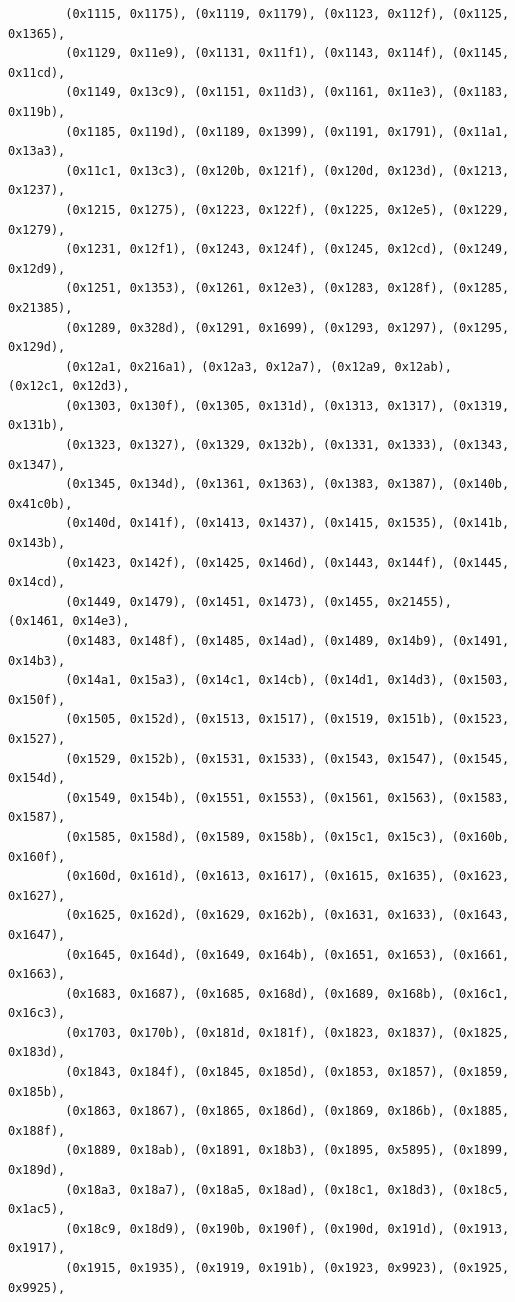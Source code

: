 \documentclass[11pt,a4paper]{article}
\begin{document}
\begin{lstlisting}
        (0x1115, 0x1175), (0x1119, 0x1179), (0x1123, 0x112f), (0x1125, 0x1365),
        (0x1129, 0x11e9), (0x1131, 0x11f1), (0x1143, 0x114f), (0x1145, 0x11cd),
        (0x1149, 0x13c9), (0x1151, 0x11d3), (0x1161, 0x11e3), (0x1183, 0x119b),
        (0x1185, 0x119d), (0x1189, 0x1399), (0x1191, 0x1791), (0x11a1, 0x13a3),
        (0x11c1, 0x13c3), (0x120b, 0x121f), (0x120d, 0x123d), (0x1213, 0x1237),
        (0x1215, 0x1275), (0x1223, 0x122f), (0x1225, 0x12e5), (0x1229, 0x1279),
        (0x1231, 0x12f1), (0x1243, 0x124f), (0x1245, 0x12cd), (0x1249, 0x12d9),
        (0x1251, 0x1353), (0x1261, 0x12e3), (0x1283, 0x128f), (0x1285, 0x21385),
        (0x1289, 0x328d), (0x1291, 0x1699), (0x1293, 0x1297), (0x1295, 0x129d),
        (0x12a1, 0x216a1), (0x12a3, 0x12a7), (0x12a9, 0x12ab), (0x12c1, 0x12d3),
        (0x1303, 0x130f), (0x1305, 0x131d), (0x1313, 0x1317), (0x1319, 0x131b),
        (0x1323, 0x1327), (0x1329, 0x132b), (0x1331, 0x1333), (0x1343, 0x1347),
        (0x1345, 0x134d), (0x1361, 0x1363), (0x1383, 0x1387), (0x140b, 0x41c0b),
        (0x140d, 0x141f), (0x1413, 0x1437), (0x1415, 0x1535), (0x141b, 0x143b),
        (0x1423, 0x142f), (0x1425, 0x146d), (0x1443, 0x144f), (0x1445, 0x14cd),
        (0x1449, 0x1479), (0x1451, 0x1473), (0x1455, 0x21455), (0x1461, 0x14e3),
        (0x1483, 0x148f), (0x1485, 0x14ad), (0x1489, 0x14b9), (0x1491, 0x14b3),
        (0x14a1, 0x15a3), (0x14c1, 0x14cb), (0x14d1, 0x14d3), (0x1503, 0x150f),
        (0x1505, 0x152d), (0x1513, 0x1517), (0x1519, 0x151b), (0x1523, 0x1527),
        (0x1529, 0x152b), (0x1531, 0x1533), (0x1543, 0x1547), (0x1545, 0x154d),
        (0x1549, 0x154b), (0x1551, 0x1553), (0x1561, 0x1563), (0x1583, 0x1587),
        (0x1585, 0x158d), (0x1589, 0x158b), (0x15c1, 0x15c3), (0x160b, 0x160f),
        (0x160d, 0x161d), (0x1613, 0x1617), (0x1615, 0x1635), (0x1623, 0x1627),
        (0x1625, 0x162d), (0x1629, 0x162b), (0x1631, 0x1633), (0x1643, 0x1647),
        (0x1645, 0x164d), (0x1649, 0x164b), (0x1651, 0x1653), (0x1661, 0x1663),
        (0x1683, 0x1687), (0x1685, 0x168d), (0x1689, 0x168b), (0x16c1, 0x16c3),
        (0x1703, 0x170b), (0x181d, 0x181f), (0x1823, 0x1837), (0x1825, 0x183d),
        (0x1843, 0x184f), (0x1845, 0x185d), (0x1853, 0x1857), (0x1859, 0x185b),
        (0x1863, 0x1867), (0x1865, 0x186d), (0x1869, 0x186b), (0x1885, 0x188f),
        (0x1889, 0x18ab), (0x1891, 0x18b3), (0x1895, 0x5895), (0x1899, 0x189d),
        (0x18a3, 0x18a7), (0x18a5, 0x18ad), (0x18c1, 0x18d3), (0x18c5, 0x1ac5),
        (0x18c9, 0x18d9), (0x190b, 0x190f), (0x190d, 0x191d), (0x1913, 0x1917),
        (0x1915, 0x1935), (0x1919, 0x191b), (0x1923, 0x9923), (0x1925, 0x9925),

\end{lstlisting}
\end{document}
